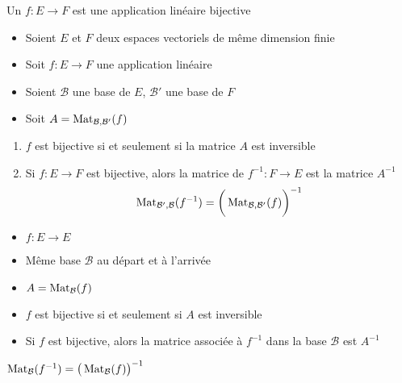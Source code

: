 \begin{frame}

Un  $f : E \to F$ est une application linéaire bijective
\pause

\begin{theoreme}
\label{th:invmatlin}
\begin{itemize}
  \item Soient $E$ et $F$ deux espaces vectoriels de même dimension finie
  \item Soit $f : E \to F$ une application linéaire
  \item Soient $\mathcal{B}$ une base de $E$, $\mathcal{B}'$ une base de $F$
  \item Soit $A = \mathop{\text{Mat}}\nolimits_{\mathcal{B},\mathcal{B}'} (f)$
\end{itemize}
\pause

\begin{enumerate}
  \item $f$ est bijective si et seulement si la matrice $A$ est inversible
 \pause 
  
  \item  Si $f : E \to F$ est bijective, alors la matrice de 
  $f^{-1} : F \to E$ est la matrice $A^{-1}$
  \pause
  \vspace*{-2ex}
  $$\mathop{\text{Mat}}\nolimits_{\mathcal{B}',\mathcal{B}}(f^{-1}) = \bigg( \mathop{\text{Mat}}\nolimits_{\mathcal{B},\mathcal{B}'}(f) \bigg)^{-1}$$
\end{enumerate}
\end{theoreme}
\end{frame}


\begin{frame}

\begin{itemize}
  \item $f : E \to E$
  \item Même base $\mathcal{B}$ au départ et à l'arrivée
  \item $A = \mathop{\text{Mat}}\nolimits_{\mathcal{B}}(f)$
\end{itemize}

\pause
\begin{corollaire}
\begin{itemize}
  \item $f$ est bijective si et seulement si $A$ est inversible
  
  \item Si $f$ est bijective, alors la matrice associée à 
  $f^{-1}$ dans la base $\mathcal{B}$ est $A^{-1}$
\end{itemize}
\end{corollaire}

\pause
\centerline{$\mathop{\text{Mat}}\nolimits_{\mathcal{B}}(f^{-1}) = \big(\mathop{\text{Mat}}\nolimits_{\mathcal{B}}(f) \big)^{-1}$}
\end{frame}


